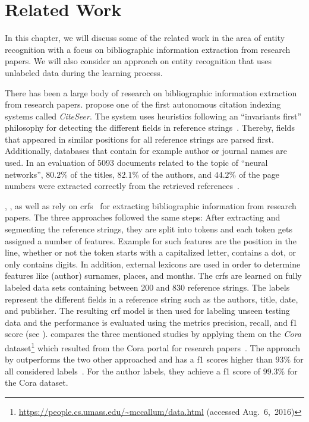 \chapter{Related Work}\label{cha:related-work}
In this chapter, we will discuss some of the related work in the area of entity recognition with a focus on bibliographic information extraction from research papers.
We will also consider an approach on entity recognition that uses unlabeled data during the learning process.

\bigskip

There has been a large body of research on bibliographic information extraction from research papers.
\citet{giles1998citeseer} propose one of the first autonomous citation indexing systems called \emph{CiteSeer}.
The system uses heuristics following an ``invariants first'' philosophy for detecting the different fields in reference strings~\citep{giles1998citeseer}.
Thereby, fields that appeared in similar positions for all reference strings are parsed first.
Additionally, databases that contain for example author or journal names are used.
In an evaluation of \num{5093} documents related to the topic of ``neural networks'', $80.2\%$ of the titles, $82.1\%$ of the authors, and $44.2\%$ of the page numbers were extracted correctly from the retrieved references~\cite{giles1998citeseer}.

\citet{peng2004accurate}, \citet{councill2008parscit}, as well as \citet{groza2012reference} rely on \glspl{crf}~\citep{lafferty2001conditional} for extracting bibliographic information from research papers.
The three approaches followed the same steps:
After extracting and segmenting the reference strings, they are split into tokens and each token gets assigned a number of features.
Example for such features are the position in the line, whether or not the token starts with a capitalized letter, contains a dot, or only contains digits.
In addition, external lexicons are used in order to determine features like (author) surnames, places, and months.
The \glspl{crf} are learned on fully labeled data sets containing between 200 and 830 reference strings.
The labels represent the different fields in a reference string such as the authors, title, date, and publisher.
The resulting \gls{crf} model is then used for labeling unseen testing data and the performance is evaluated using the metrics \gls{precision}, \gls{recall}, and \gls{f1 score} (see ).
\citet{groza2012reference} compares the three mentioned studies by applying them on the \textit{Cora} dataset\footnote{\url{https://people.cs.umass.edu/~mccallum/data.html} (accessed Aug.~6,~2016)} which resulted from the Cora portal for research papers~\citep{mccallum2000automating}.
The approach by \citet{groza2012reference} outperforms the two other approached and has a \glspl{f1 score} higher than $93\%$ for all considered labels~\citep{groza2012reference}.
For the author labels, they achieve a \gls{f1 score} of $99.3\%$ for the Cora dataset.

